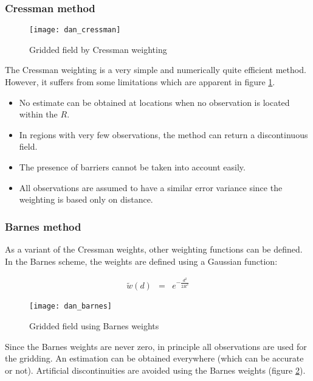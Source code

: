 
\begin{frame}
\frametitle{Cressman method}

\begin{figure}[H]
\centerline{\texttt{[image: dan\_cressman]}}
\caption{Gridded field by Cressman weighting}
\label{fig:dan_cressman}
\end{figure}

\vspace{-1cm}

{\fontsize{9pt}{10}\selectfont The Cressman weighting is a very simple and numerically quite
efficient method. However, it suffers from some limitations which are
apparent in figure \ref{fig:dan_cressman}.

\begin{itemize}
\item No estimate can be obtained at locations when no observation is
  located within the $R$.
\item In regions with very few observations, the method can return a
  discontinuous field.
\item The presence of barriers
  cannot be taken into account easily.
\item All observations are assumed to have a similar error
  variance since the weighting is based only on distance.
\end{itemize}}

\end{frame}


\begin{frame}
\frametitle{Barnes method}

{\fontsize{9pt}{10}\selectfont As a variant of the Cressman weights, other weighting functions can be
defined. In the Barnes scheme, the weights are defined using a
Gaussian function:}

\begin{eqnarray}
\tilde{w}(d) &=& e^{-\frac{d^2}{2 R^2}}
\end{eqnarray}

\begin{figure}[H]
\centerline{\texttt{[image: dan\_barnes]}}
\caption{Gridded field using Barnes weights}
\label{dan_barnes}
\end{figure}

\vspace{-1cm}

{\fontsize{9pt}{10}\selectfont Since the Barnes weights are never zero, in principle all observations
are used for the gridding. An estimation can be obtained everywhere
(which can be accurate or not). Artificial discontinuities are avoided
using the Barnes weights (figure \ref{dan_barnes}).}

\end{frame}

